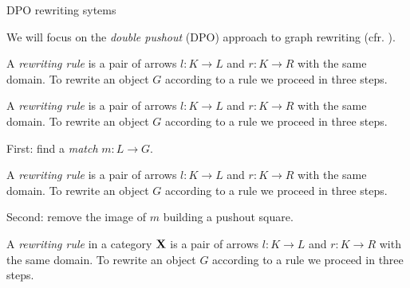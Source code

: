 \documentclass[usenames,dvipsnames]{beamer}
\def\X{\textbf {\textup{X}}}
\begin{document}
\begin{frame}{DPO rewriting sytems}\justifying
	
	
		We will focus on the \emph{double pushout} (DPO) approach  to  graph rewriting (cfr. \cite{ehrig2006fundamentals}).
	
	\smallskip 
	\begin{overprint}
		A \emph{rewriting rule} is a pair  of arrows $l:K\to L$ and $r:K\to R$ with the same domain. To rewrite an object $G$ according to a rule we proceed in three steps.
		
		
		A \emph{rewriting rule} is a pair  of arrows $l:K\to L$ and $r:K\to R$ with the same domain. To rewrite an object $G$ according to a rule we proceed in three steps.
		
		First: find a \emph{match} $m:L\to G$.
		\begin{center}
		\end{center}
		
		

A \emph{rewriting rule} is a pair  of arrows $l:K\to L$ and $r:K\to R$ with the same domain. To rewrite an object $G$ according to a rule we proceed in three steps.		
		
		Second: remove the image of $m$  building a pushout square. \vspace{-0.075cm}
		\begin{center}
		\end{center}		
		
		A \emph{rewriting rule} in a category $\X$ is a pair  of arrows $l:K\to L$ and $r:K\to R$ with the same domain. To rewrite an object $G$ according to a rule we proceed in three steps.
		

\end{overprint}
\end{frame}
\end{document}
